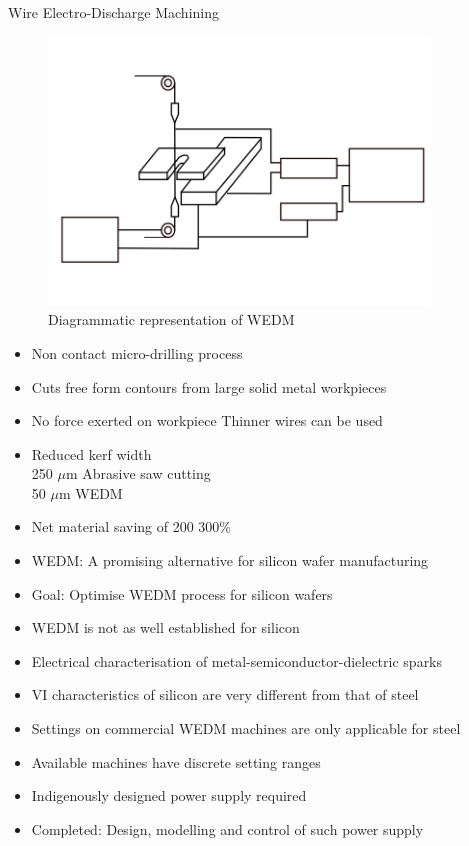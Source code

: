 \documentclass[10pt]{beamer}
\begin{document}
\begin{frame}[allowframebreaks]{Wire Electro-Discharge Machining}
  \begin{figure}
    \centering
    \includegraphics[width=0.9\textwidth]{wedm-diag}
    \caption{Diagrammatic representation of WEDM}
    \label{fig:lit-1}
  \end{figure}
  \framebreak
  \begin{itemize}
    \item \alert{Non contact} micro-drilling process
    \item Cuts free form contours from large solid metal workpieces
    \item \alert{No force exerted} on workpiece \textendash{} Thinner wires can be used
    \item \alert{Reduced kerf width} \cite{dongre2015multi} \\ 250 $\mu$m \textendash{} Abrasive saw cutting \\ 50 $\mu$m \textendash{} WEDM
    \item Net material saving of 200 \textendash{} 300\% \cite{dongre2015multi}
    \item WEDM: A promising alternative for silicon wafer manufacturing
    \item Goal: Optimise WEDM process for silicon wafers
  \end{itemize}

  \framebreak
  \begin{itemize}
    \item WEDM is not as well established for silicon
    \item Electrical characterisation of \alert{metal-semiconductor-dielectric} sparks
    \item \alert{VI characteristics} of silicon are very \alert{different} from that of steel \cite{kane2017aps}
    \item Settings on commercial WEDM machines are only \alert{applicable for steel} \cite{levy1990wed}
    \item Available machines have discrete setting ranges
    \item Indigenously designed power supply required
    \item Completed: Design, modelling and control of such power supply 
  \end{itemize}
\end{frame}
\end{document}
